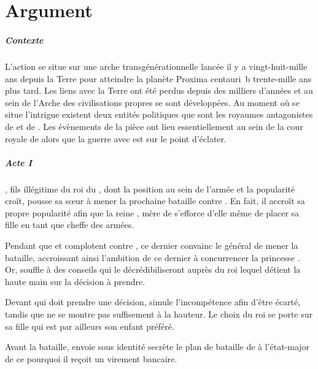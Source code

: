 \chapter{Argument}
  \makeatletter
  \pagestyle{fancy2}
  \fancyhead[LE,RO]{\thepage}
  \fancyfoot{}

  \makeatother

\paragraph{Contexte}
L’action se situe sur une arche transgénérationnelle lancée il y a vingt-huit-mille ans depuis la Terre pour atteindre la planète Proxima centauri~b trente-mille ans plus tard. Les liens avec la Terre ont été perdus depuis des milliers d’années et au sein de l’Arche des civilisations propres se sont développées. Au moment où se situe l’intrigue existent deux entités politiques que sont les royaumes antagonistes de \campprincipal{} et de \campoppose{}.
Les évènements de la pièce ont lieu essentiellement au sein de la cour royale de \campprincipal{} alors que la guerre avec \campoppose{} est sur le point d’éclater.

\paragraph{Acte I}
\elena{}, fils illégitime du roi du \campprincipal, dont la position au sein de l’armée et la popularité croît, pousse sa sœur \princesse{} à mener la prochaine bataille contre \campoppose{}. En fait, il accroît sa propre popularité afin que la reine \reine{}, mère de \princesse{}  s’efforce d’elle même de placer sa fille en tant que cheffe des armées.

Pendant que \reine{} et \princesse{} complotent contre \elena{},
ce dernier convainc le général \general{} de mener la bataille, accroissant ainsi l’ambition de ce dernier à concurrencer la princesse \princesse{}. Or, \elena{} souffle à \general{} des conseils qui le décrédibiliseront auprès du roi \roi{} lequel détient la haute main sur la décision à prendre.

Devant \roi{} qui doit prendre une décision, \elena{} simule l’incompétence afin d’être écarté, tandis que \general{} ne se montre pas suffisement à la hauteur. Le choix du roi se porte sur sa fille \princesse{} qui est par ailleurs son enfant préféré.

Avant la bataille, \elena{} envoie sous identité secrète le plan de bataille de \princesse{} à l’état-major de \campoppose{} ce pourquoi il reçoit un virement bancaire.


